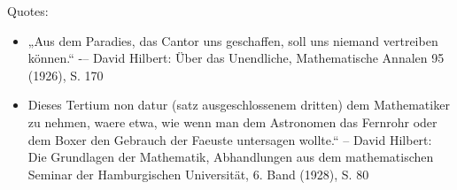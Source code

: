 \documentclass[hidelinks]{article}
\theoremstyle{plain}
\theoremstyle{definition}
\theoremstyle{rem}
\begin{document}
Quotes: 
\begin{itemize}
\item „Aus dem Paradies, das Cantor uns geschaffen, soll uns niemand vertreiben können.“ -– David Hilbert: Über das Unendliche, Mathematische Annalen 95 (1926), S. 170 
\item Dieses Tertium non datur (satz ausgeschlossenem dritten) dem Mathematiker zu nehmen, waere etwa, wie wenn man dem Astronomen das Fernrohr oder dem Boxer den Gebrauch der Faeuste untersagen wollte.“ – David Hilbert: Die Grundlagen der Mathematik, Abhandlungen aus dem mathematischen Seminar der Hamburgischen Universität, 6. Band (1928), S. 80
\end{itemize}
\end{document}
